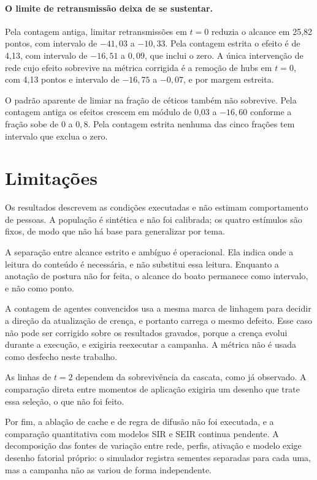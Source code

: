 \paragraph{O limite de retransmissão deixa de se sustentar.} Pela contagem
antiga, limitar retransmissões em $t=0$ reduzia o alcance em 25,82 pontos, com
intervalo de $-41{,}03$ a $-10{,}33$. Pela contagem estrita o efeito é de 4,13,
com intervalo de $-16{,}51$ a $0{,}09$, que inclui o zero. A única intervenção
de rede cujo efeito sobrevive na métrica corrigida é a remoção de hubs em
$t=0$, com 4,13 pontos e intervalo de $-16{,}75$ a $-0{,}07$, e por margem
estreita.

O padrão aparente de limiar na fração de céticos também não sobrevive. Pela
contagem antiga os efeitos crescem em módulo de 0,03 a $-16{,}60$ conforme a
fração sobe de $0$ a $0{,}8$. Pela contagem estrita nenhuma das cinco frações
tem intervalo que exclua o zero.

\section{Limitações}

Os resultados descrevem as condições executadas e não estimam comportamento de
pessoas. A população é sintética e não foi calibrada; os quatro estímulos são
fixos, de modo que não há base para generalizar por tema.

A separação entre alcance estrito e ambíguo é operacional. Ela indica onde a
leitura do conteúdo é necessária, e não substitui essa leitura. Enquanto a
anotação de postura não for feita, o alcance do boato permanece como intervalo,
e não como ponto.

A contagem de agentes convencidos usa a mesma marca de linhagem para decidir a
direção da atualização de crença, e portanto carrega o mesmo defeito. Esse caso
não pode ser corrigido sobre os resultados gravados, porque a crença evolui
durante a execução, e exigiria reexecutar a campanha. A métrica não é usada
como desfecho neste trabalho.

As linhas de $t=2$ dependem da sobrevivência da cascata, como já observado. A
comparação direta entre momentos de aplicação exigiria um desenho que trate
essa seleção, o que não foi feito.

Por fim, a ablação de cache e de regra de difusão não foi executada, e a
comparação quantitativa com modelos SIR e SEIR continua pendente. A decomposição
das fontes de variação entre rede, perfis, ativação e modelo exige desenho
fatorial próprio: o simulador registra sementes separadas para cada uma, mas a
campanha não as variou de forma independente.


